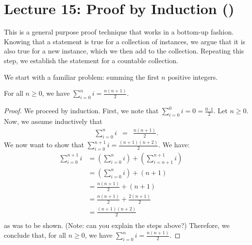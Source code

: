 \section*{Lecture 15: Proof by Induction ()}

This is a general purpose proof technique that works in a bottom-up fashion.
Knowing that a statement is true for a collection of instances, we argue that it
is also true for a new instance, which we then add to the collection.  Repeating
this step, we establish the statement for a countable collection.

We start with a familiar problem: summing the first $n$ positive integers.
%
\begin{lemma}
    For all $n \geq 0$, we have $\sum_{i=0}^n i = \frac{n(n+1)}{2}$.
\end{lemma}
\begin{proof}
    We proceed by induction.
    First, we note that $\sum_{i=0}^0 i = 0= \frac{0\cdot 1}{2}$.
    Let $n\geq 0$.
    Now, we assume inductively that
    \begin{eqnarray*}
        \sum_{i=0}^{n} i  &=&  \frac{n(n+1)}{2}.
    \end{eqnarray*}
    We now want to show that $\sum_{i=0}^{n+1} i  =  \frac{(n+1)(n+2)}{2}$.
    We have:
    \begin{align*}
        \sum_{i=0}^{n+1} i
            &=  \left(\sum_{i=0}^{n} i \right) + \left(\sum_{i=n+1}^{n+1} i \right)
            && \\%
            &= \left(\sum_{i=0}^{n} i \right) + (n+1)
            && \\%
            &= \frac{n(n+1)}{2} + (n+1)
            && \\%
            &= \frac{n(n+1)}{2} + \frac{2(n+1)}{2}
            && \\%
            &= \frac{(n+1)(n+2)}{2}
            && \\%
    \end{align*}
    as was to be shown. (Note: can you explain the steps above?)  Therefore, we conclude
    that, for all $n \geq 0$, we have $\sum_{i=0}^n i = \frac{n(n+1)}{2}$.
\end{proof}

